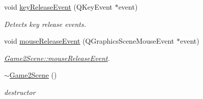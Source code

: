 \begin{DoxyCompactItemize}
\item 
void \hyperlink{classGame2Scene_ae876b70229a171d135daef2dcc6cd7ac}{key\-Release\-Event} (Q\-Key\-Event $\ast$event)
\begin{DoxyCompactList}\small\item\em Detects key release events. \end{DoxyCompactList}\item 
void \hyperlink{classGame2Scene_a0150f2992b0229a27d6d9852f4e5e7d3}{mouse\-Release\-Event} (Q\-Graphics\-Scene\-Mouse\-Event $\ast$event)
\begin{DoxyCompactList}\small\item\em \hyperlink{classGame2Scene_a0150f2992b0229a27d6d9852f4e5e7d3}{Game2\-Scene\-::mouse\-Release\-Event}. \end{DoxyCompactList}\item 
\hypertarget{classGame2Scene_afb89d017cdab6ebf2c7224803fb88d2b}{\hyperlink{classGame2Scene_afb89d017cdab6ebf2c7224803fb88d2b}{$\sim$\-Game2\-Scene} ()}\label{classGame2Scene_afb89d017cdab6ebf2c7224803fb88d2b}

\begin{DoxyCompactList}\small\item\em destructor \end{DoxyCompactList}\end{DoxyCompactItemize}
